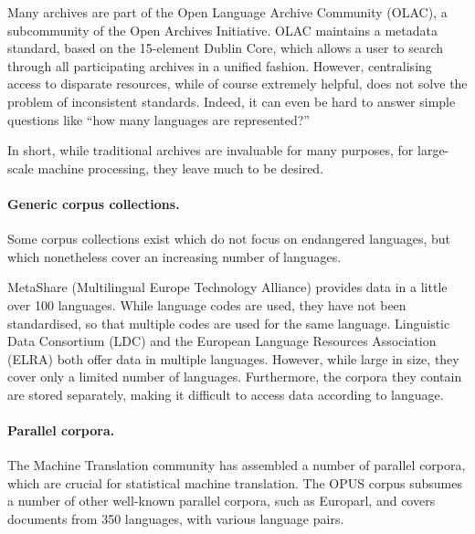 Many archives are part of the Open Language Archive Community (OLAC), a subcommunity of the Open Archives Initiative.  OLAC maintains a metadata standard, based on the 15-element Dublin Core, which allows a user to search through all participating archives in a unified fashion.  However, centralising access to disparate resources, while of course extremely helpful, does not solve the problem of inconsistent standards.  Indeed, it can even be hard to answer simple questions like ``how many languages are represented?''

In short, while traditional archives are invaluable for many purposes, for large-scale machine processing, they leave much to be desired.


\paragraph{Generic corpus collections.}
Some corpus collections exist which do not focus on endangered languages, but which nonetheless cover an increasing number of languages.

MetaShare (Multilingual Europe Technology Alliance) provides data in a little over 100 languages. While language codes are used, they have not been standardised, so that multiple codes are used for the same language.  Linguistic Data Consortium (LDC) and the European Language Resources Association (ELRA) both offer data in multiple languages.  However, while large in size, they cover only a limited number of languages.  Furthermore, the corpora they contain are stored separately, making it difficult to access data according to language.


\paragraph{Parallel corpora.}

The Machine Translation community has assembled a number of parallel corpora, which are crucial for statistical machine translation. The OPUS corpus \cite{tiedemann2012opus} subsumes a number of other well-known parallel corpora, such as Europarl, and covers documents from 350 languages, with various language pairs.  


